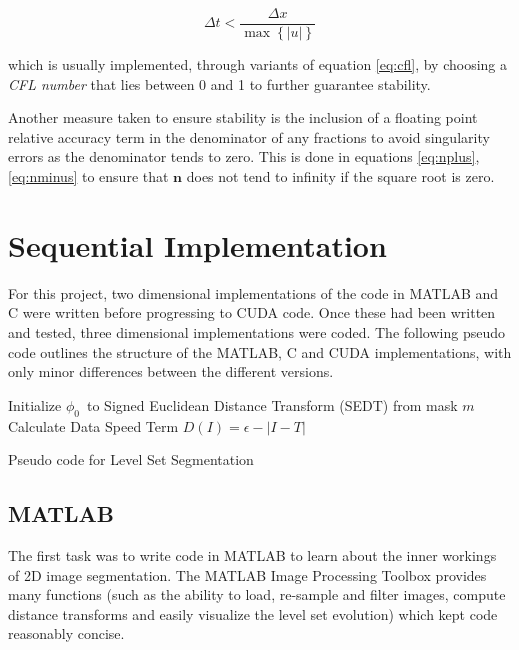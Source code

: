 \begin{equation}
\Delta t < \frac{\Delta x}{\max{\left\{|u|\right\}}}
\label{eq:cfl}
\end{equation}

which is usually implemented, through variants of equation \eqref{eq:cfl}, by choosing a \textit{CFL number} that lies between 0 and 1 to further guarantee stability.

Another measure taken to ensure stability is the inclusion of a floating point relative accuracy term in the denominator of any fractions to avoid singularity errors as the denominator tends to zero. This is done in equations \eqref{eq:nplus},\eqref{eq:nminus} to ensure that $\textbf{n}$ does not tend to infinity if the square root is zero.

\section{Sequential Implementation}
For this project, two dimensional implementations of the code in MATLAB and C were written before progressing to CUDA code. Once these had been written and tested, three dimensional implementations were coded. The following pseudo code outlines the structure of the MATLAB, C and CUDA implementations, with only minor differences between the different versions.

\begin{algorithm}[h]
\BlankLine
\dontprintsemicolon
{}
\BlankLine
\SetLine
Initialize $\phi_0$\ to Signed Euclidean Distance Transform (SEDT) from mask $m$\;
Calculate Data Speed Term $D(I)= \epsilon - |I-T|$\;
\caption{Pseudo code for Level Set Segmentation}\label{alg:alg}
\end{algorithm}


	\subsection{MATLAB}
The first task was to write code in MATLAB to learn about the inner workings of 2D image segmentation. The MATLAB Image Processing Toolbox provides many functions (such as the ability to load, re-sample and filter images, compute distance transforms and easily visualize the level set evolution) which kept code reasonably concise. 

